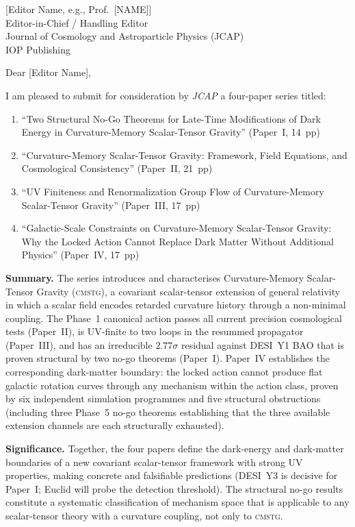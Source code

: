 \documentclass[12pt,a4paper]{letter}
\begin{document}
\begin{letter}{[Editor Name, e.g., Prof.\ [NAME]]\\
               Editor-in-Chief / Handling Editor\\
               Journal of Cosmology and Astroparticle Physics (JCAP)\\
               IOP Publishing}

\opening{Dear [Editor Name],}

I am pleased to submit for consideration by \textit{JCAP} a four-paper series
titled:

\begin{enumerate}
  \item ``Two Structural No-Go Theorems for Late-Time Modifications of Dark Energy
        in Curvature-Memory Scalar-Tensor Gravity'' (Paper~I, 14~pp)
  \item ``Curvature-Memory Scalar-Tensor Gravity: Framework, Field Equations, and
        Cosmological Consistency'' (Paper~II, 21~pp)
  \item ``UV Finiteness and Renormalization Group Flow of Curvature-Memory
        Scalar-Tensor Gravity'' (Paper~III, 17~pp)
  \item ``Galactic-Scale Constraints on Curvature-Memory Scalar-Tensor Gravity:
        Why the Locked Action Cannot Replace Dark Matter Without Additional Physics''
        (Paper~IV, 17~pp)
\end{enumerate}

\textbf{Summary.}
The series introduces and characterises Curvature-Memory Scalar-Tensor Gravity
(\textsc{cmstg}), a covariant scalar-tensor extension of general relativity in which
a scalar field encodes retarded curvature history through a non-minimal coupling.
The Phase~1 canonical action passes all current precision cosmological tests
(Paper~II), is UV-finite to two loops in the resummed propagator (Paper~III), and
has an irreducible $2.77\sigma$ residual against DESI~Y1 BAO that is proven
structural by two no-go theorems (Paper~I). Paper~IV establishes the corresponding
dark-matter boundary: the locked action cannot produce flat galactic rotation curves
through any mechanism within the action class, proven by six independent simulation
programmes and five structural obstructions (including three Phase~5 no-go theorems
establishing that the three available extension channels are each structurally
exhausted).

\textbf{Significance.}
Together, the four papers define the dark-energy and dark-matter boundaries of a
new covariant scalar-tensor framework with strong UV properties, making concrete and
falsifiable predictions (DESI~Y3 is decisive for Paper~I; Euclid will probe the
detection threshold). The structural no-go results constitute a systematic
classification of mechanism space that is applicable to any scalar-tensor theory
with a curvature coupling, not only to \textsc{cmstg}.


\end{letter}
\end{document}
